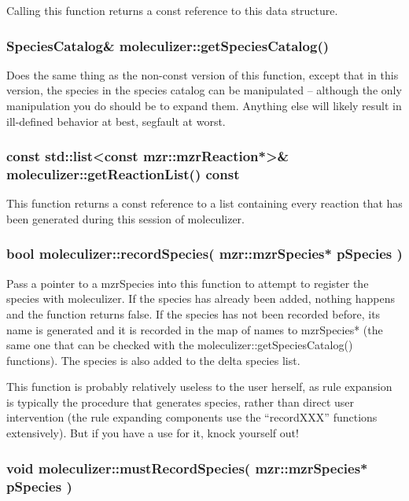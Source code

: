 Calling this function returns a const reference to this
data structure.  

\subsubsection{SpeciesCatalog\& moleculizer::getSpeciesCatalog() }

Does the same thing as the non-const version of this function, except
that in this version, the species in the species catalog can be
manipulated -- although the only manipulation you do should be to
expand them.  Anything else will likely result in ill-defined behavior
at best, segfault at worst.  

\subsubsection{const std::list<const mzr::mzrReaction*>\& moleculizer::getReactionList()
  const}

This function returns a const reference to a list containing every
reaction that has been generated during this session of moleculizer.  

\subsubsection{bool moleculizer::recordSpecies( mzr::mzrSpecies*
  pSpecies ) }

Pass a pointer to a mzrSpecies into this function to attempt to
register the species with moleculizer.  If the species has already
been added, nothing happens and the function returns false.  If the
species has not been recorded before, its name is generated and it is
recorded in the map of names to mzrSpecies* (the same one that can be
checked with the moleculizer::getSpeciesCatalog() functions).  The
species is also added to the delta species list.  

This function is probably relatively useless to the user herself,
as rule expansion is typically the procedure that generates species,
rather than direct user intervention (the rule expanding components
use the ``recordXXX'' functions extensively).  But if you have a use
for it, knock yourself out!

\subsubsection{void moleculizer::mustRecordSpecies( mzr::mzrSpecies*
  pSpecies )}

